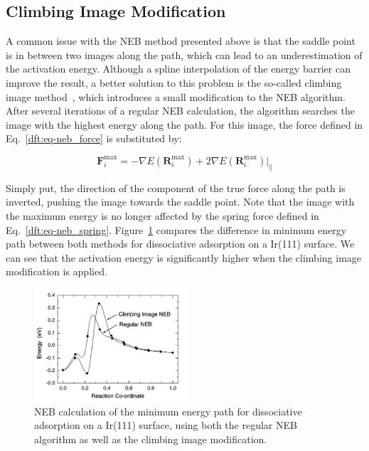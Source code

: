 \begin{refsection}
\subsection{Climbing Image Modification}

A common issue with the \gls{NEB} method presented above is that the saddle point is 
in between two images along the path, which can lead to an underestimation of 
the activation energy. Although a spline interpolation of the energy barrier 
can improve the result, a better solution to this problem is the so-called 
climbing image method~\cite{Henkelman2000a}, which introduces a small 
modification to the \gls{NEB} algorithm. After several iterations of a regular \gls{NEB} 
calculation, the algorithm searches the image with the highest energy along 
the path. For this image, the force defined in Eq.~\ref{dft:eq-neb_force} is 
substituted by: 

\begin{equation}
\mathbf{F}_i^{\text{max}} = -\nabla E(\mathbf{R}_i^{\text{max}}) + 2\nabla 
E(\mathbf{R}_i^{\text{max}})|_\parallel 
\end{equation}

Simply put, the direction of the component of the true force along the path is 
inverted, pushing the image towards the saddle point. Note that the image with 
the maximum energy is no longer affected by the spring force defined in 
Eq.~\ref{dft:eq-neb_spring}. Figure~\ref{dft:fig-neb_climbing} compares the difference 
in minimum energy path between both methods for  dissociative 
adsorption on a Ir(111) surface. We can see that the activation energy is 
significantly higher when the climbing image modification is applied. 
 
\begin{figure}[ht] 
\centering 
\includegraphics[width=0.5\textwidth]{./figures/DFT/ci-neb.png} 
\caption{\label{dft:fig-neb_climbing} \gls{NEB} calculation of the minimum energy path 
for  dissociative adsorption on a Ir(111) surface, using both the 
regular \gls{NEB} algorithm as well as the climbing image 
modification.~\cite{Henkelman2000a}} 
\end{figure} 

\clearpage
\pagestyle{biblio}
\printbibliography 

\end{refsection} 
